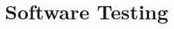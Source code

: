 \chapter{Software Testing }
\ifpdf
    \graphicspath{{Chapter4/Chapter4Figs/PNG/}{Chapter4/Chapter4Figs/PDF/}{Chapter4/Chapter4Figs/}}
\else
    \graphicspath{{Chapter4/Chapter4Figs/EPS/}{Chapter4/Chapter4Figs/}}
\fi



  

